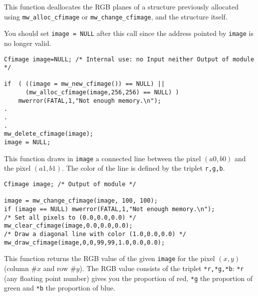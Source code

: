 \newpage %

\Description
This function deallocates the RGB planes of a \cfimage structure previously
allocated using \verb+mw_alloc_cfimage+ or \verb+mw_change_cfimage+, and the
structure itself. 

You should set \verb+image = NULL+ after this call since the address pointed
by \verb+image+ is no longer valid.

\Next
\Example
\begin{verbatim}
Cfimage image=NULL; /* Internal use: no Input neither Output of module */

if  ( ((image = mw_new_cfimage()) == NULL) ||
      (mw_alloc_cfimage(image,256,256) == NULL) )
    mwerror(FATAL,1,"Not enough memory.\n");
.
.
.
mw_delete_cfimage(image);
image = NULL;

\end{verbatim}

\newpage %
\Description
This function draws in \verb+image+ a connected line between the pixel $(a0,b0)$ and the pixel $(a1,b1)$. The color of the line is defined by the triplet \verb+r,g,b+.

\Next
\Example
\begin{verbatim}
Cfimage image; /* Output of module */

image = mw_change_cfimage(image, 100, 100);
if (image == NULL) mwerror(FATAL,1,"Not enough memory.\n");
/* Set all pixels to (0.0,0.0,0.0) */
mw_clear_cfimage(image,0.0,0.0,0.0);
/* Draw a diagonal line with color (1.0,0.0,0.0) */
mw_draw_cfimage(image,0,0,99,99,1.0,0.0,0.0);
\end{verbatim}

\newpage %
\Description
This function returns the RGB value of the given \verb+image+ for the pixel $(x,y)$ (column $\# x$ and row $\# y$).
The RGB value consists of the triplet \verb+*r,*g,*b+: \verb+*r+ (any floating point number) gives you the proportion of red, \verb+*g+ the proportion of green and \verb+*b+ the proportion of blue.

